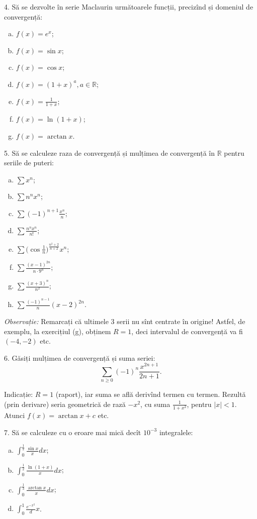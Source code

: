 \documentclass[11pt,a4paper]{article}
\newcommand\ds{\displaystyle}
\newcommand\RR{\mathbb{R}}
\theoremstyle{dotless}
\theoremstyle{dotlessdr}
\begin{document}
4. Să se dezvolte în serie Maclaurin următoarele funcții, precizînd și
domeniul de convergență:
\begin{enumerate}[(a)]
\item $f(x) = e^x$;
\item $f(x) = \sin x$;
\item $f(x) = \cos x$;
\item $f(x) = (1 + x)^a, a \in \RR$;
\item $f(x) = \frac{1}{1 + x}$;
\item $f(x) = \ln (1 + x)$;
\item $f(x) = \arctan x$.
\end{enumerate}

\vspace{1cm}

5. Să se calculeze raza de convergență și mulțimea de convergență în $\RR$
pentru seriile de puteri:
\begin{enumerate}[(a)]
\item $\sum x^n$;
\item $\sum n^n x^n$;
\item $\sum (-1)^{n + 1} \frac{x^n}{n}$;
\item $\sum \frac{n^n x^n}{n!}$;
\item $\sum \Big( \cos \frac{1}{n} \Big)^{\frac{n^2 + 2}{n + 2}} x^n$;
\item $\sum \frac{(x - 1)^{2n}}{n \cdot 9^n}$;
\item $\sum \frac{(x + 3)^n}{n^2}$;
\item $\sum \frac{(-1)^{n - 1}}{n} (x - 2)^{2n}$.
\end{enumerate}

\emph{Observație:} Remarcați că ultimele 3 serii nu sînt centrate în origine!
Astfel, de exemplu, la exercițiul (g), obținem $R = 1$, deci intervalul de
convergență va fi $(-4, -2)$ etc.

\vspace{1cm}

6. Găsiți mulțimea de convergență și suma seriei:
\[
  \sum_{n \geq 0} (-1)^n \frac{x^{2n+1}}{2n + 1}.
\]

Indicație: $R = 1$ (raport), iar suma se află derivînd termen cu termen.
Rezultă (prin derivare) seria geometrică de rază $-x^2$, cu suma
$\frac{1}{1 + x^2}$, pentru $|x| < 1$. Atunci $f(x) = \arctan x + c$ etc.

\vspace{1cm}

7. Să se calculeze cu o eroare mai mică decît $10^{-3}$ integralele:
\begin{enumerate}[(a)]
\item $\ds\int_0^{\frac{1}{2}} \frac{\sin x}{x} dx$;
\item $\ds\int_0^{\frac{1}{2}} \frac{\ln(1 + x)}{x} dx$;
\item $\ds\int_0^{\frac{1}{3}} \frac{\arctan x}{x} dx$;
\item $\ds\int_0^1 \frac{e^{-x^2}} dx$.
\end{enumerate}
\end{document}
